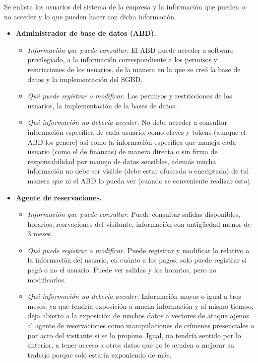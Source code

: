 \documentclass[12pt]{article}
\begin{document}
Se enlista los usuarios del sistema de la empresa y la información que pueden o no acceder y lo que pueden hacer con dicha información.

\begin{itemize}
	\item \textbf{Administrador de base de datos (ABD).}
		\begin{itemize}
			\item \textit{Información que puede consultar.} El ABD puede acceder a software privilegiado, a la información correspondiente a los permisos y restricciones de los usuarios, de la manera en la que se creó la base de datos y la implementación del SGBD.
			\item \textit{Qué puede registrar o modificar.} Los permisos y restricciones de los usuarios, la implementación de la bases de datos.
			\item \textit{Qué información no debería acceder.} No debe acceder a consultar información específica de cada usuario, como claves y tokens (aunque el ABD los genere) así como la información específica que maneja cada usuario (como el de finanzas) de manera directa o sin firma de responsabilidad por manejo de datos sensibles, además mucha información no debe ser visible (debe estar ofuscada o encriptada) de tal manera que ni el ABD lo pueda ver (cuando se conveniente realizar esto).
		\end{itemize}
	\item \textbf{Agente de reservaciones.}
		\begin{itemize}
			\item \textit{Información que puede consultar.} Puede consultar salidas disponibles, horarios, resrvaciones del visitante, información con antigüedad menor de 3 meses.
			\item \textit{Qué puede registrar o modificar.} Puede registrar y modificar lo relativo a la información del usuario, en cuánto a los pagos, solo puede registrar si pagó o no el usuario. Puede ver salidas y los horarios, pero no modificarlos.
			\item \textit{Qué información no debería acceder.} Información mayor o igual a tres meses, ya que tendría exposición a mucha información y al mismo tiempo, deja abierto a la exposición de muchos datos a vectores de ataque ajenos al agente de reservaciones como manipulaciones de crímenes presenciales o por acto del visitante si se lo propone. Igual, no tendría sentido por lo anterior, a tener acceso a otros datos que no le ayuden a mejorar su trabajo porque solo estaría exponiendo de más.

\end{itemize}
\end{itemize}
\end{document}
